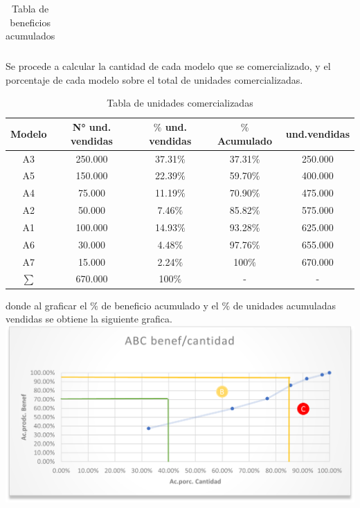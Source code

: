 \documentclass{report}
\begin{document}
\begin{raggedright}
\begin{table}[h]
\begin{tabular}{cccc}
		\bottomrule
	\end{tabular}
	\caption{Tabla de beneficios acumulados}
\end{table}
Se procede a calcular la cantidad de cada modelo que se comercializado, y el porcentaje de cada modelo sobre el total de unidades comercializadas.\\
\newpage
\begin{table}[h]
	\centering
	\begin{tabular}{ccccc}
		\toprule
		\textbf{Modelo} & \textbf{N° und. vendidas} &\textbf{$\%$ und. vendidas} & \textbf{$\%$ Acumulado} & \textbf{und.vendidas}  \\
		\midrule
		A3 & 250.000 & 37.31$\%$ & 37.31$\%$ & 250.000 \\
		A5 & 150.000 & 22.39$\%$ & 59.70$\%$ & 400.000 \\
		A4 & 75.000  & 11.19$\%$ & 70.90$\%$ & 475.000 \\
		A2 & 50.000  & 7.46$\%$ & 85.82$\%$ & 575.000  \\
		A1 & 100.000 & 14.93$\%$ & 93.28$\%$ & 625.000 \\
		A6 & 30.000  & 4.48$\%$ & 97.76$\%$ & 655.000  \\
		A7 & 15.000  & 2.24$\%$ & 100$\%$ & 670.000    \\
		\midrule
		$\sum$ & 670.000 & 100$\%$ & - & - \\
		\bottomrule
	\end{tabular}
	\caption{Tabla de unidades comercializadas}
\end{table}
donde al graficar el $\%$ de beneficio acumulado y el $ \%$ de unidades acumuladas vendidas se obtiene la siguiente grafica.\\
\vspace{1\baselineskip}
\includegraphics{benef.png}\\
\vspace{1\baselineskip}


\end{raggedright}
\end{document}
